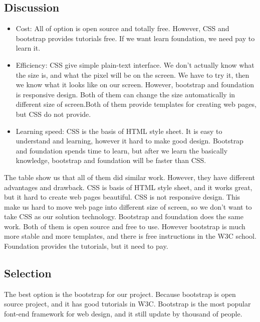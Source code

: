 \subsection{Discussion}

\begin{itemize}
  \item Cost: All of option is open source and totally free. However, CSS and bootstrap provides tutorials free. If we want learn foundation, we need pay to learn it.
  \item Efficiency: CSS give simple plain-text interface. We don't actually know what the size is, and what the pixel will be on the screen. We have to try it, then we know what it looks like on our screen. However, bootstrap and foundation is responsive design. Both of them can change the size automatically in different size of screen.Both of them provide templates for creating web pages, but CSS do not provide.
  \item Learning speed: CSS is the basis of HTML style sheet. It is easy to understand and learning, however it hard to make good design. Bootstrap and foundation spends time to learn, but after we learn the basically knowledge, bootstrap and foundation will be faster than CSS.
\end{itemize}

The table show us that all of them did similar work. However, they have different advantages and drawback. CSS is basis of HTML style sheet, and it works great, but it hard to create web pages beautiful. CSS is not responsive design. This make us hard to move web page into different size of screen, so we don't want to take CSS as our solution technology. Bootstrap and foundation does the same work. Both of them is open source and free to use. However bootstrap is much more stable and more templates, and there is free instructions in the W3C school. Foundation provides the tutorials, but it need to pay.


\subsection{Selection}
The best option is the bootstrap for our project. Because bootstrap is open source project, and it has good tutorials in W3C. Bootstrap is the most popular font-end framework for web design, and it still update by thousand of people.
